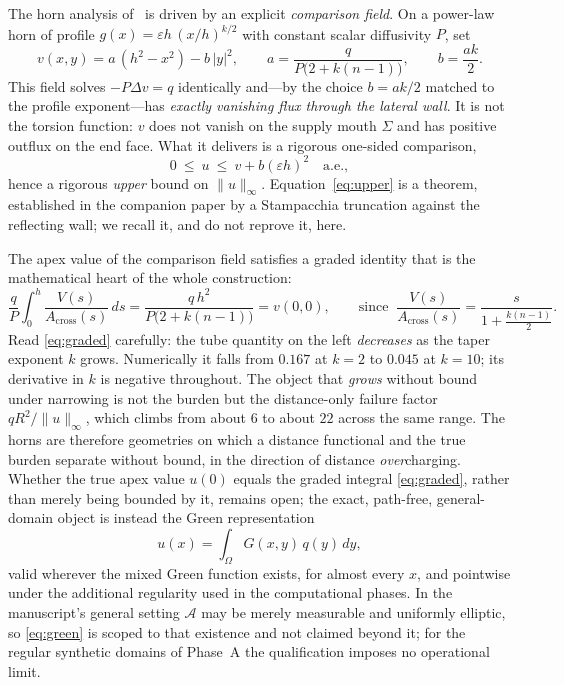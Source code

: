 \documentclass[11pt]{article}
\theoremstyle{remark}
\newcommand{\Om}{\Omega}
\newcommand{\Sig}{\Sigma}
\newcommand{\Acr}{A_{\mathrm{cross}}}
\newcommand{\norminf}[1]{\lVert#1\rVert_{\infty}}
\newcommand{\eps}{\varepsilon}
\begin{document}
The horn analysis of~\cite{torsion} is driven by an explicit \emph{comparison
field}. On a power-law horn of profile $g(x)=\eps h\,(x/h)^{k/2}$ with constant
scalar diffusivity $P$, set
\begin{equation}\label{eq:vfield}
v(x,y)=a\,(h^2-x^2)-b\,\lvert y\rvert^2,\qquad
a=\frac{q}{P\bigl(2+k(n-1)\bigr)},\qquad b=\frac{ak}{2}.
\end{equation}
This field solves $-P\Delta v=q$ identically and---by the choice $b=ak/2$
matched to the profile exponent---has \emph{exactly vanishing flux through the
lateral wall}. It is not the torsion function: $v$ does not vanish on the supply
mouth $\Sig$ and has positive outflux on the end face. What it delivers is a
rigorous one-sided comparison,
\begin{equation}\label{eq:upper}
0\ \le\ u\ \le\ v+b(\eps h)^2\quad\text{a.e.},
\end{equation}
hence a rigorous \emph{upper} bound on $\norminf{u}$. Equation~\eqref{eq:upper}
is a theorem, established in the companion paper by a Stampacchia truncation
against the reflecting wall; we recall it, and do not reprove it, here.

The apex value of the comparison field satisfies a graded identity that is the
mathematical heart of the whole construction:
\begin{equation}\label{eq:graded}
\frac{q}{P}\int_0^h\frac{V(s)}{\Acr(s)}\,ds
=\frac{q\,h^2}{P\bigl(2+k(n-1)\bigr)}=v(0,0),
\qquad\text{since }\ \frac{V(s)}{\Acr(s)}=\frac{s}{1+\tfrac{k(n-1)}{2}}.
\end{equation}
Read \eqref{eq:graded} carefully: the tube quantity on the left \emph{decreases}
as the taper exponent $k$ grows. Numerically it falls from $0.167$ at $k=2$ to
$0.045$ at $k=10$; its derivative in $k$ is negative throughout. The object that
\emph{grows} without bound under narrowing is not the burden but the
distance-only failure factor $qR^2/\norminf{u}$, which climbs from about $6$ to
about $22$ across the same range. The horns are therefore geometries on which a
distance functional and the true burden separate without bound, in the direction
of distance \emph{over}charging. Whether the true apex value $u(0)$ equals the
graded integral \eqref{eq:graded}, rather than merely being bounded by it,
remains open; the exact, path-free, general-domain object is instead the Green
representation
\begin{equation}\label{eq:green}
u(x)=\int_\Om G(x,y)\,q(y)\,dy,
\end{equation}
valid wherever the mixed Green function exists, for almost every $x$, and
pointwise under the additional regularity used in the computational phases. In
the manuscript's general setting $\mathcal{A}$ may be merely measurable and
uniformly elliptic, so \eqref{eq:green} is scoped to that existence and not
claimed beyond it; for the regular synthetic domains of Phase~A the qualification
imposes no operational limit.
\end{document}
